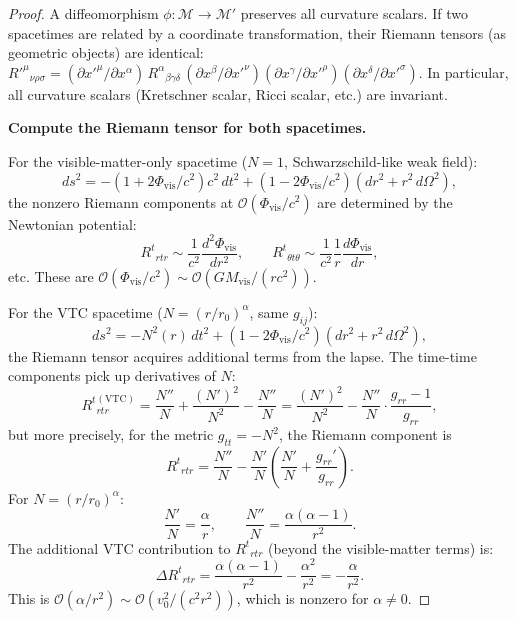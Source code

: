 \documentclass[11pt,a4paper]{article}
\theoremstyle{definition}
\newcommand{\vis}{\mathrm{vis}}
\newcommand{\VTC}{\mathrm{VTC}}
\begin{document}
\begin{proof}
A diffeomorphism $\phi: \mathcal{M} \to \mathcal{M}'$ preserves all curvature scalars. If two spacetimes are related by a coordinate transformation, their Riemann tensors (as geometric objects) are identical: $R'^{\mu}{}_{\nu\rho\sigma} = (\partial x'^\mu/\partial x^\alpha)\,R^{\alpha}{}_{\beta\gamma\delta}\,(\partial x^\beta/\partial x'^\nu)(\partial x^\gamma/\partial x'^\rho)(\partial x^\delta/\partial x'^\sigma)$. In particular, all curvature scalars (Kretschner scalar, Ricci scalar, etc.) are invariant.

\textbf{Compute the Riemann tensor for both spacetimes.}

For the visible-matter-only spacetime ($N = 1$, Schwarzschild-like weak field):
\begin{equation}
ds^2 = -(1 + 2\Phi_{\vis}/c^2)c^2\,dt^2 + (1 - 2\Phi_{\vis}/c^2)(dr^2 + r^2\,d\Omega^2),
\end{equation}
the nonzero Riemann components at $\mathcal{O}(\Phi_{\vis}/c^2)$ are determined by the Newtonian potential:
\begin{equation}
R^t{}_{rtr} \sim \frac{1}{c^2}\frac{d^2\Phi_{\vis}}{dr^2}, \qquad R^t{}_{\theta t\theta} \sim \frac{1}{c^2}\frac{1}{r}\frac{d\Phi_{\vis}}{dr},
\end{equation}
etc. These are $\mathcal{O}(\Phi_{\vis}/c^2) \sim \mathcal{O}(GM_{\vis}/(rc^2))$.

For the VTC spacetime ($N = (r/r_0)^\alpha$, same $g_{ij}$):
\begin{equation}
ds^2 = -N^2(r)\,dt^2 + (1 - 2\Phi_{\vis}/c^2)(dr^2 + r^2\,d\Omega^2),
\end{equation}
the Riemann tensor acquires additional terms from the lapse. The time-time components pick up derivatives of $N$:
\begin{equation}
R^t{}_{rtr}^{(\VTC)} = \frac{N''}{N} + \frac{(N')^2}{N^2} - \frac{N''}{N} = \frac{(N')^2}{N^2} - \frac{N''}{N}\cdot\frac{g_{rr}-1}{g_{rr}},
\end{equation}
but more precisely, for the metric $g_{tt} = -N^2$, the Riemann component is
\begin{equation}
R^t{}_{rtr} = \frac{N''}{N} - \frac{N'}{N}\left(\frac{N'}{N} + \frac{g_{rr}'}{g_{rr}}\right).
\end{equation}
For $N = (r/r_0)^\alpha$:
\begin{equation}
\frac{N'}{N} = \frac{\alpha}{r}, \qquad \frac{N''}{N} = \frac{\alpha(\alpha-1)}{r^2}.
\end{equation}
The additional VTC contribution to $R^t{}_{rtr}$ (beyond the visible-matter terms) is:
\begin{equation}
\Delta R^t{}_{rtr} = \frac{\alpha(\alpha-1)}{r^2} - \frac{\alpha^2}{r^2} = -\frac{\alpha}{r^2}.
\end{equation}
This is $\mathcal{O}(\alpha/r^2) \sim \mathcal{O}(v_0^2/(c^2 r^2))$, which is nonzero for $\alpha \neq 0$.


\end{proof}
\end{document}

